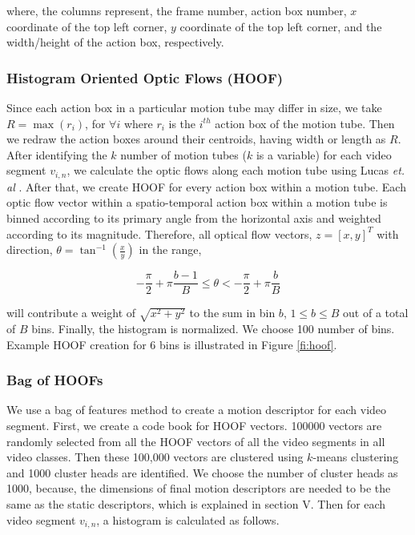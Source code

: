 where, the columns represent, the frame number, action box number, $x$ coordinate of the top left corner,
$y$ coordinate of the top left corner, and the width/height of the action box, respectively.

\subsubsection{Histogram Oriented Optic Flows (HOOF)}
Since each action box in a particular motion tube may differ in size, we take $R = \max(r_{i})$, for $\forall{i}$
where $r_{i}$ is the $i^{th}$ action box of the motion tube. Then we redraw the action boxes around their centroids, having width or length as $R$.
After identifying the $k$ number of motion tubes ($k$ is a variable) for each video segment $v_{i,n}$, we calculate the optic flows along each motion tube
using Lucas \textit{et. al} \cite{lucas1981iterative}.
After that, we create HOOF\cite{chaudhry2009histograms} for every
action box within a motion tube. Each optic flow vector within a spatio-temporal action box within a motion tube is binned according
to its primary angle from the horizontal axis and weighted according to its magnitude.  Therefore, all optical flow vectors, $z=[x,y]^T$ with direction,
$\theta = \tan^{-1}(\frac{x}{y})$ in the range,

\begin{equation}
- \frac{\pi}{2} + \pi\frac{b-1}{B} \leq \theta < -\frac{\pi}{2} + \pi\frac{b}{B}
\end{equation}

will contribute a weight of $\sqrt{x^2 + y^2}$ to the sum in bin $b$, $1 \leq b \leq B$ out of a total of
$B$ bins. Finally, the histogram is normalized. We choose 100 number of bins. Example HOOF creation for 6 bins is illustrated in Figure \ref{fi:hoof}.

\subsubsection{Bag of HOOFs}
We use a bag of features method to create a motion descriptor for each video segment. First, we create a code book for HOOF vectors.
100000 vectors are randomly selected from all the HOOF vectors of all the video segments in all video classes.
Then these 100,000 vectors are clustered using $k$-means clustering and 1000 cluster heads
are identified. We choose the number of cluster heads as 1000, because, the dimensions of final motion descriptors are needed to be the same as
the static descriptors, which is explained in section V. Then for each video segment $v_{i,n}$, a histogram is calculated as follows.


